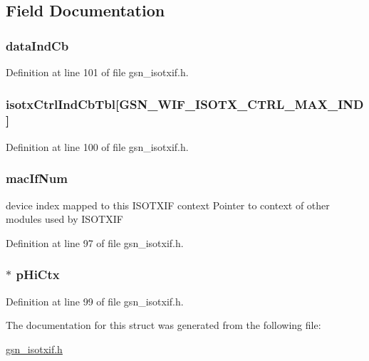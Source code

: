 \subsection{Field Documentation}
\hypertarget{a00105_a30f0e7ec261354cbdfd47048527b3373}{
\subsubsection[{dataIndCb}]{ {\bf dataIndCb}}}
\label{a00105_a30f0e7ec261354cbdfd47048527b3373}


Definition at line 101 of file gsn\_\-isotxif.h.

\hypertarget{a00105_a64be33f39615940ee3459e0af01a01dc}{
\subsubsection[{isotxCtrlIndCbTbl}]{ {\bf isotxCtrlIndCbTbl}\mbox{[}GSN\_\-WIF\_\-ISOTX\_\-CTRL\_\-MAX\_\-IND\mbox{]}}}
\label{a00105_a64be33f39615940ee3459e0af01a01dc}


Definition at line 100 of file gsn\_\-isotxif.h.

\hypertarget{a00105_ae57ae92e651751e7978e237c55133b4c}{
\subsubsection[{macIfNum}]{ {\bf macIfNum}}}
\label{a00105_ae57ae92e651751e7978e237c55133b4c}
device index mapped to this ISOTXIF context Pointer to context of other modules used by ISOTXIF 

Definition at line 97 of file gsn\_\-isotxif.h.

\hypertarget{a00105_ab671e23204d79f8fda7dba9992c3d6e9}{
\subsubsection[{pHiCtx}]{$\ast$ {\bf pHiCtx}}}
\label{a00105_ab671e23204d79f8fda7dba9992c3d6e9}


Definition at line 99 of file gsn\_\-isotxif.h.



The documentation for this struct was generated from the following file:\begin{DoxyCompactItemize}
\item 
\hyperlink{a00521}{gsn\_\-isotxif.h}\end{DoxyCompactItemize}

